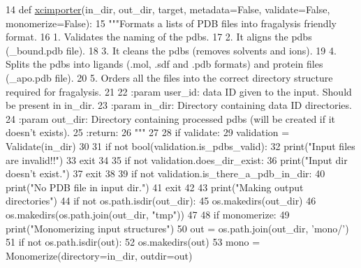 \begin{DoxyCode}
14 \textcolor{keyword}{def }\hyperlink{namespacefragalysis__api_1_1xcimporter_1_1xcimporter_a673f390dc6b7d0062ec8d9510079dded}{xcimporter}(in\_dir, out\_dir, target, metadata=False, validate=False, monomerize=False):
15     \textcolor{stringliteral}{"""Formats a lists of PDB files into fragalysis friendly format.}
16 \textcolor{stringliteral}{    1. Validates the naming of the pdbs.}
17 \textcolor{stringliteral}{    2. It aligns the pdbs (\_bound.pdb file).}
18 \textcolor{stringliteral}{    3. It cleans the pdbs (removes solvents and ions).}
19 \textcolor{stringliteral}{    4. Splits the pdbs into ligands (.mol, .sdf and .pdb formats) and protein files (\_apo.pdb file).}
20 \textcolor{stringliteral}{    5. Orders all the files into the correct directory structure required for fragalysis.}
21 \textcolor{stringliteral}{}
22 \textcolor{stringliteral}{    :param user\_id: data ID given to the input. Should be present in in\_dir.}
23 \textcolor{stringliteral}{    :param in\_dir: Directory containing data ID directories.}
24 \textcolor{stringliteral}{    :param out\_dir: Directory containing processed pdbs (will be created if it doesn't exists).}
25 \textcolor{stringliteral}{    :return:}
26 \textcolor{stringliteral}{    """}
27 
28     \textcolor{keywordflow}{if} validate:
29         validation = Validate(in\_dir)
30 
31         \textcolor{keywordflow}{if} \textcolor{keywordflow}{not} bool(validation.is\_pdbs\_valid):
32             print(\textcolor{stringliteral}{"Input files are invalid!!"})
33             exit
34 
35         \textcolor{keywordflow}{if} \textcolor{keywordflow}{not} validation.does\_dir\_exist:
36             print(\textcolor{stringliteral}{"Input dir doesn't exist."})
37             exit
38 
39         \textcolor{keywordflow}{if} \textcolor{keywordflow}{not} validation.is\_there\_a\_pdb\_in\_dir:
40             print(\textcolor{stringliteral}{"No PDB file in input dir."})
41             exit
42 
43     print(\textcolor{stringliteral}{"Making output directories"})
44     \textcolor{keywordflow}{if} \textcolor{keywordflow}{not} os.path.isdir(out\_dir):
45         os.makedirs(out\_dir)
46         os.makedirs(os.path.join(out\_dir, \textcolor{stringliteral}{"tmp"}))
47 
48     \textcolor{keywordflow}{if} monomerize:
49         print(\textcolor{stringliteral}{"Monomerizing input structures"})
50         out = os.path.join(out\_dir, \textcolor{stringliteral}{'mono/'})
51         \textcolor{keywordflow}{if} \textcolor{keywordflow}{not} os.path.isdir(out):
52             os.makedirs(out)
53         mono = Monomerize(directory=in\_dir, outdir=out)

\end{DoxyCode}
